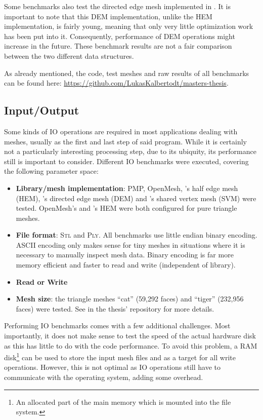 Some benchmarks also test the directed edge mesh implemented in .
It is important to note that this DEM implementation, unlike the HEM implementation, is fairly young, meaning that only very little optimization work has been put into it.
Consequently, performance of DEM operations might increase in the future.
These benchmark results are not a fair comparison between the two different data structures.

As already mentioned, the code, test meshes and raw results of all benchmarks can be found here: \url{https://github.com/LukasKalbertodt/masters-thesis}.


\newpage
\subsection{Input/Output}

Some kinds of IO operations are required in most applications dealing with meshes, usually as the first and last step of said program.
While it is certainly not a particularly interesting processing step, due to its ubiquity, its performance still is important to consider.
Different IO benchmarks were executed, covering the following parameter space:

\begin{itemize}
  \item \textbf{Library/mesh implementation}: PMP, OpenMesh, 's half edge mesh (HEM), 's directed edge mesh (DEM) and 's shared vertex mesh (SVM) were tested.
  OpenMesh's and 's HEM were both configured for pure triangle meshes.
  \item \textbf{File format}: \textsc{Stl} and \textsc{Ply}.
  All benchmarks use little endian binary encoding.
  ASCII encoding only makes sense for tiny meshes in situations where it is necessary to manually inspect mesh data.
  Binary encoding is far more memory efficient and faster to read and write (independent of library).
  \item \textbf{Read or Write}
  \item \textbf{Mesh size}: the triangle meshes \enquote{cat} (59,292 faces) and \enquote{tiger} (232,956 faces) were tested.
  See  in the thesis' repository for more details.
\end{itemize}

Performing IO benchmarks comes with a few additional challenges.
Most importantly, it does not make sense to test the speed of the actual hardware disk as this has little to do with the code performance.
To avoid this problem, a RAM disk\footnote{An allocated part of the main memory which is mounted into the file system.} can be used to store the input mesh files and as a target for all write operations.
However, this is not optimal as IO operations still have to communicate with the operating system, adding some overhead.

